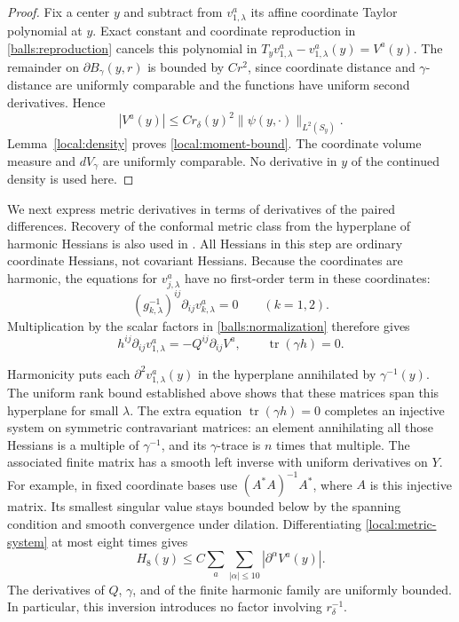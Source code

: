 \begin{proof}
Fix a center $y$ and subtract from $v_{1,\lambda}^a$ its affine
coordinate Taylor polynomial at $y$.  Exact constant and coordinate
reproduction in \eqref{balls:reproduction} cancels this polynomial in
$T_yv_{1,\lambda}^a-v_{1,\lambda}^a(y)=V^a(y)$.  The remainder on
$\partial B_\gamma(y,r)$ is bounded by $Cr^2$, since coordinate
distance and $\gamma$-distance are uniformly comparable and the
functions have uniform second derivatives.  Hence
\[
 |V^a(y)|\leq C r_\delta(y)^2
                         \|\psi(y,\cdot)\|_{L^2(S_y)}.
\]
Lemma~\ref{local:density} proves \eqref{local:moment-bound}.  The
coordinate volume measure and $dV_\gamma$ are uniformly comparable.
No derivative in $y$ of the continued density is used here.
\end{proof}

We next express metric derivatives in terms of derivatives of the paired
differences.  Recovery of the conformal metric
class from the hyperplane of harmonic Hessians is also used in
\citep[Proposition~4.1 and Remark~4.2]{LLS20}.
All Hessians in this step are
ordinary coordinate Hessians, not covariant Hessians.  Because the
coordinates are harmonic, the equations for $v_{j,\lambda}^a$ have
no first-order term in these coordinates:
\[
 (g_{k,\lambda}^{-1})^{ij}\partial_{ij}v_{k,\lambda}^a=0
 \qquad(k=1,2).
\]
Multiplication by the scalar factors in
\eqref{balls:normalization} therefore gives
\begin{equation}\label{local:metric-system}
 h^{ij}\partial_{ij}v_{1,\lambda}^a
       =-Q^{ij}\partial_{ij}V^a,
 \qquad \operatorname{tr}(\gamma h)=0.
\end{equation}

Harmonicity puts each $\partial^2v_{1,\lambda}^a(y)$ in the hyperplane
annihilated by $\gamma^{-1}(y)$.  The uniform rank bound established
above shows that these matrices span this hyperplane for small $\lambda$.  The extra equation
$\operatorname{tr}(\gamma h)=0$ completes an injective system on
symmetric contravariant matrices: an element annihilating all those
Hessians is a multiple of $\gamma^{-1}$, and its $\gamma$-trace is
$n$ times that multiple.  The associated finite matrix has a smooth
left inverse with uniform derivatives on $Y$.  For example, in fixed
coordinate bases use $(A^*A)^{-1}A^*$, where $A$ is this injective
matrix.  Its smallest singular value stays bounded below by the
spanning condition and smooth convergence under dilation.
Differentiating \eqref{local:metric-system} at most eight times gives
\begin{equation}\label{local:metric-jet-bound}
 H_8(y)\leq C\sum_a\sum_{|\alpha|\leq10}
                              |\partial^\alpha V^a(y)|.
\end{equation}
The derivatives of $Q$, $\gamma$, and of the finite harmonic family
are uniformly bounded.  In particular, this inversion introduces no
factor involving $r_\delta^{-1}$.


